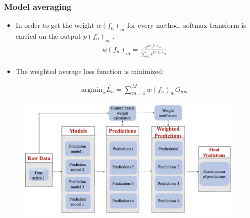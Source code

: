 \documentclass[10pt,aspectratio=43]{beamer}
\begin{document}
\begin{frame}
  \frametitle{Model averaging}
  \begin{itemize}

\item In order to get the weight $w(f_{n})_{m}$ for every method, softmax transform is carried on the output $p(f_{n})_{m}$  .
\begin{equation*}
  \begin{aligned}
   w(f_{n})_{m}=\frac{e^{p(f_{n})_{m}}}{\sum_{m}e^{p(f_{n})_{m}}}
  \end{aligned}
\end{equation*}

\item The weighted average loss function is minimized:

  \begin{equation*}
  \begin{aligned}
    \mathrm{argmin}_{w}\overline { L _ { n } } =\sum\nolimits_{m=1}^{M}w(f_{n})_{m}O_{nm}
  \end{aligned}
\end{equation*}
\end{itemize}

\begin{figure}[htb]
  \centering
  \includegraphics[width=0.7\linewidth]{figures/model-averging-feature-based}
  \label{fig:framework}
\end{figure}

\end{frame}
\end{document}
